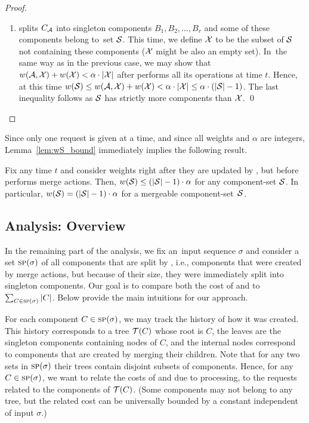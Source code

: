 \begin{proof}
\begin{enumerate}
\item \CREP splits $C_{\mathcal{A}}$ into singleton components $B_1, B_2, \ldots, B_r$ 
and some of these components belong to~set $\mathcal{S}$. This time, we define $\mathcal{X}$ to be
the subset of $\mathcal{S}$ not containing these components ($\mathcal{X}$ might be also an empty set). In~the
same way as in the previous case, we may show that $w(\mathcal{A},\mathcal{X}) + w(\mathcal{X}) < \alpha
\cdot |\mathcal{X}|$ after \CREP performs all its operations at time $t$. Hence, at this
time $w(\mathcal{S}) \leq w(\mathcal{A},\mathcal{X}) + w(\mathcal{X}) < \alpha \cdot |\mathcal{X}| \leq \alpha \cdot (|\mathcal{S}|-1)$.
The last inequality follows as $\mathcal{S}$ has strictly more components than $\mathcal{X}$.
\qed
\end{enumerate}
\end{proof}

Since only one request is given at a time, and since all weights and $\alpha$
are integers, Lemma~\ref{lem:wS_bound} immediately implies the following
result.

\begin{corollary}
\label{cor:mergeable_sets} Fix any time $t$ and consider weights right after
they are updated by \CREP, but before \CREP performs merge actions. Then,
$w(\mathcal{S}) \leq (|\mathcal{S}|-1) \cdot \alpha$ for any component-set $\mathcal{S}$. In particular,
$w(\mathcal{S}) = (|\mathcal{S}|-1) \cdot \alpha$ for a mergeable component-set~$\mathcal{S}$.
\end{corollary}


\subsection{Analysis: Overview}

In the remaining part of the analysis, we fix an~input sequence $\sigma$ and
consider a set $\textsc{sp}(\sigma)$ of all components that are split by \CREP, i.e.,
components that were created by merge actions, but because of their size, they
were immediately split into singleton components. Our goal is to compare both
the cost of \OPT and \CREP to $\sum_{C \in \textsc{sp}(\sigma)} |C|$. 
Below provide the main intuitions for our approach.

For each component $C \in \textsc{sp}(\sigma)$, we may track the history of how it was
created. This history corresponds to a tree $\mathcal{T}(C)$ whose root is $C$, the leaves are the singleton components containing nodes of $C$, and the internal nodes correspond
to components that are created by merging their children. Note that for any
two sets in $\textsc{sp}(\sigma)$ their trees contain disjoint subsets of components.
Hence, for any $C \in \textsc{sp}(\sigma)$, we want to relate the costs of \OPT and
\CREP due to processing, 
to the requests related to the components of $\mathcal{T}(C)$. (Some
components may not belong to any tree, but the related cost can be universally
bounded by a constant independent of input $\sigma$.)

